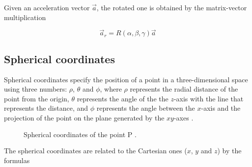 Given an acceleration vector $\vec a$, the rotated one is obtained by the matrix-vector multiplication

\[
	\vec a_r = R(\alpha, \beta, \gamma) \vec a
\]

\subsection{Spherical coordinates}
Spherical coordinates specify the position of a point in a three-dimensional space using three numbers: $\rho$, $\theta$ and $\phi$, where $\rho$ represents the radial distance of the point from the origin, $\theta$ represents the angle of the the $z$-axis with the line that represents the distance, and $\phi$ represents the angle between the $x$-axis and the projection of the point on the plane generated by the $xy$-axes \cite{Sok}.

\begin{center}
	\begin{figure}[ht]
		\caption{Spherical coordinates of the point P \cite{HartleySpherical}.}
	\end{figure}
\end{center}
The spherical coordinates are related to the Cartesian ones ($x$, $y$ and $z$) by the formulas \cite{Sok}

